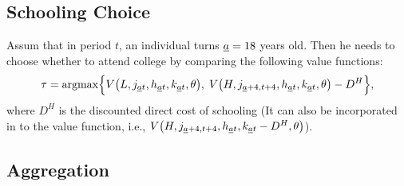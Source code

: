 \documentclass[12pt]{article}
\theoremstyle{definition}
\begin{document}
\begin{spacing}{1}
\subsection{Schooling Choice}

Assum that in period $t$, an individual turns $\underline{a}=18$ years old. Then he needs to choose whether to attend college by comparing the following value functions:
\begin{equation}
	\tau = \operatorname*{argmax} \Bigl\{V{\left( L, j_{\underline{a}t}, h_{{\underline{a}t}}, k_{\underline{a}t}, \theta \right)},\; V{\left( H, j_{\underline{a}+4, t+4}, h_{{\underline{a}t}}, k_{\underline{a}t}, \theta \right)} - D^H\Bigl\} ,
\end{equation}
where $D^H$ is the discounted direct cost of schooling (It can also be incorporated in to the value function, i.e., $V{\left( H, j_{\underline{a}+4, t+4}, h_{{\underline{a}t}}, k_{\underline{a}t}-D^H, \theta \right)}$). 

\subsection{Aggregation}





\newpage


\end{spacing}
\end{document}
